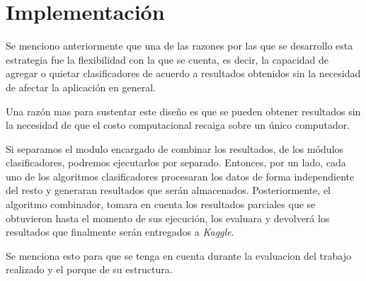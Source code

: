 \chapter{Implementación}
Se menciono anteriormente que una de las razones por las que se desarrollo esta estrategia fue la flexibilidad con la que se cuenta, es decir, la capacidad de agregar o quietar clasificadores de acuerdo a resultados obtenidos sin la necesidad de afectar la aplicación en general. 

Una razón mas para sustentar este diseño es que se pueden obtener resultados sin la necesidad de que el costo computacional recaiga sobre un único computador. 

Si separamos el modulo encargado de combinar los resultados, de los módulos clasificadores, podremos ejecutarlos por separado. Entonces, por un lado, cada uno de los algoritmos clasificadores procesaran los datos de forma independiente del resto y generaran resultados que serán almacenados. Posteriormente, el algoritmo combinador, tomara en cuenta los resultados parciales que se obtuvieron hasta el momento de sus ejecución, los evaluara y devolverá los resultados que finalmente serán entregados a \textit{Kaggle}.

Se menciona esto para que se tenga en cuenta durante la evaluacion del trabajo realizado y el porque de su estructura.
